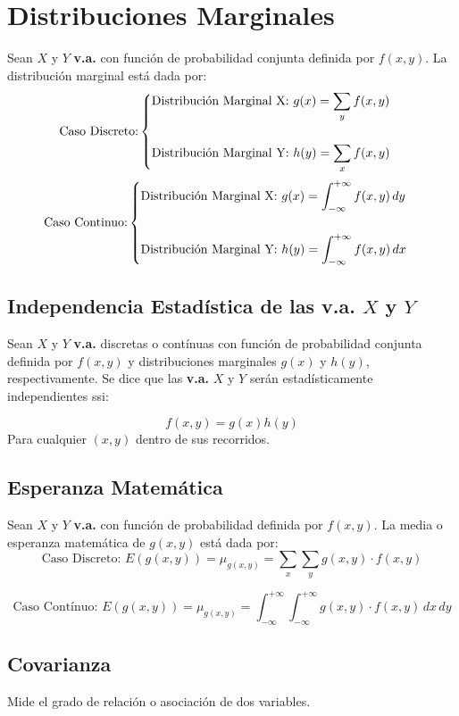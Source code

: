 \section{Distribuciones Marginales}
Sean $X$ y $Y$ \textbf{v.a.} con función de probabilidad conjunta definida por $f(x,y)$. La distribución marginal está dada por:
$$
\text{Caso Discreto:}
\begin{cases}
\text{Distribución Marginal X: } g(x)=\displaystyle\sum_{y}f(x,y)  \\ \vspace{0.1cm} \\
\text{Distribución Marginal Y: } h(y)=\displaystyle\sum_{x}f(x,y)
\end{cases}
$$
$$
\text{Caso Continuo:}
\begin{cases}
\text{Distribución Marginal X: } g(x)=\displaystyle\int_{-\infty}^{+\infty} f(x,y) \,dy \\ \vspace{0.1cm} \\
\text{Distribución Marginal Y: } h(y)=\displaystyle\int_{-\infty}^{+\infty} f(x,y) \,dx
\end{cases}
$$
\subsection{Independencia Estadística de las v.a. $X$ y $Y$}
Sean $X$ y $Y$ \textbf{v.a.} discretas o contínuas con función de probabilidad conjunta definida por $f(x,y)$ y distribuciones marginales $g(x)$ y $h(y)$, respectivamente. Se dice que las \textbf{v.a.} $X$ y $Y$ serán estadísticamente independientes ssi:

$$f(x,y)=g(x)h(y)$$
Para cualquier $(x,y)$ dentro de sus recorridos.
\subsection{Esperanza Matemática}
Sean $X$ y $Y$ \textbf{v.a.} con función de probabilidad definida por $f(x,y)$. La media o esperanza matemática de $g(x,y)$ está dada por:
$$
\text{Caso Discreto: }
E(g(x,y))=\mu_{g(x,y)}=\displaystyle\sum_{x}\displaystyle\sum_{y} g(x,y)\cdot f(x,y)
$$

$$
\text{Caso Contínuo: }
E(g(x,y))=\mu_{g(x,y)}=\displaystyle\int_{-\infty}^{+\infty}\displaystyle\int_{-\infty}^{+\infty} g(x,y)\cdot f(x,y) \,dx \,dy
$$
\subsection{Covarianza}
Mide el grado de relación o asociación de dos variables.
